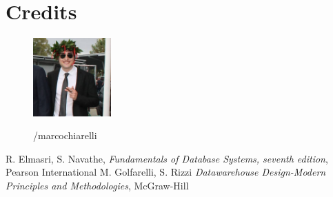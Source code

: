 \documentclass[11 pt,a4paper,twoside,openany]{book}
\begin{document}
\section*{Credits}

\begin{figure}[h]
\includegraphics[width=3cm]{figures/marco.jpg}
\vspace{0.3cm}

%
\hspace{0.05cm} /marcochiarelli

\end{figure}



\begin{thebibliography}{100}
 R. Elmasri, S. Navathe, \emph{Fundamentals of Database Systems, seventh edition}, Pearson International
 M. Golfarelli, S. Rizzi \emph{Datawarehouse Design-Modern Principles and Methodologies}, McGraw-Hill
\end{thebibliography}
\end{document}
